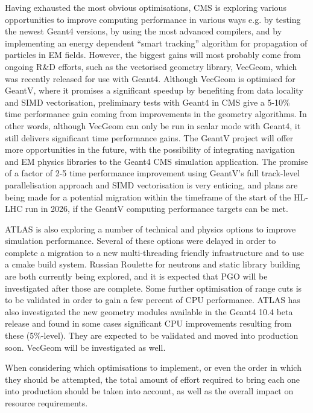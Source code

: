 \documentclass[12pt,a4paper]{article}
\begin{document}
{Having exhausted the most obvious optimisations, CMS is exploring
various opportunities to improve computing performance in various ways
e.g. by testing the newest Geant4 versions, by using the most advanced
compilers, and by implementing an energy dependent ``smart tracking''
algorithm for propagation of particles in EM fields. However, the
biggest gains will most probably come from ongoing R\&D efforts, such as
the vectorised geometry library, VecGeom, which was recently released
for use with Geant4. Although VecGeom is optimised for GeantV, where it
promises a significant speedup by benefiting from data locality and SIMD
vectorisation, preliminary tests with Geant4 in CMS give a 5-10\% time
performance gain coming from improvements in the geometry algorithms. In
other words, although VecGeom can only be run in scalar mode with
Geant4, it still delivers significant time performance gains. The GeantV
project will offer more opportunities in the future, with the
possibility of integrating navigation and EM physics libraries to the
Geant4 CMS simulation application. The promise of a factor of 2-5 time
performance improvement using GeantV's full track-level parallelisation
approach and SIMD vectorisation is very enticing, and plans are being
made for a potential migration within the timeframe of the start of the
HL-LHC run in 2026, if the GeantV computing performance targets can be
met.

ATLAS is also exploring a number of technical and physics options to
improve simulation performance. Several of these options were delayed in
order to complete a migration to a new multi-threading friendly
infrastructure and to use a cmake build system. Russian Roulette for
neutrons and static library building are both currently being explored,
and it is expected that PGO will be investigated after those are
complete. Some further optimisation of range cuts is to be validated in
order to gain a few percent of CPU performance. ATLAS has also
investigated the new geometry modules available in the Geant4 10.4 beta
release and found in some cases significant CPU improvements resulting
from these (5\%-level). They are expected to be validated and moved into
production soon. VecGeom will be investigated as well.

When considering which optimisations to implement, or even the order in
which they should be attempted, the total amount of effort required to
bring each one into production should be taken into account, as well as
the overall impact on resource requirements.

}
\end{document}
